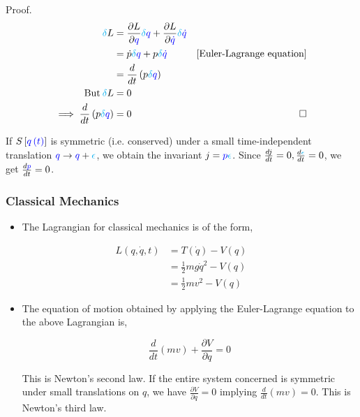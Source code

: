 \documentclass{beamer}
\begin{document}
\begin{frame}
\begin{block}{Proof.}
\begin{align*}
\textcolor{cyan}{\delta} L & = \frac{\partial L}{\partial \textcolor{blue}{q}} \textcolor{cyan}{\delta} \textcolor{blue}{q} + \frac{\partial L}{\partial \textcolor{blue}{\dot{q}}} \textcolor{cyan}{\delta} \textcolor{blue}{\dot{q}} \\
& = \dot{p} \textcolor{cyan}{\delta} \textcolor{blue}{q} + p \textcolor{cyan}{\delta} \textcolor{blue}{\dot{q}} & \left[ \text{Euler-Lagrange equation} \right] \\
& = \frac{d}{dt} \left( p \textcolor{cyan}{\delta} \textcolor{blue}{q} \right) \\
\text{But} \: \textcolor{cyan}{\delta} L & = 0 \\
\implies \frac{d}{dt} \left( p \textcolor{cyan}{\delta} \textcolor{blue}{q} \right) & = 0 & \square
\end{align*}
\end{block}

\begin{example}
If $S \left[ \textcolor{blue}{q \left( t \right)} \right]$ is symmetric (i.e. conserved) under a small time-independent translation $\textcolor{blue}{q} \to \textcolor{blue}{q} + \textcolor{cyan}{\epsilon}$, we obtain the invariant $j = \textcolor{blue}{p} \textcolor{cyan}{\epsilon}$. Since $\frac{dj}{dt} = 0, \frac{d \textcolor{cyan}{\epsilon}}{dt} = 0$, we get $\frac{d \textcolor{blue}{p}}{dt} = 0$.
\end{example}
\end{frame}

\begin{frame}
\frametitle{Classical Mechanics}

\begin{itemize}
\item The Lagrangian for classical mechanics is of the form,
\end{itemize}

\begin{align*}
L \left( q, \dot{q}, t \right) & = T \left( \dot{q} \right) - V \left( q \right) \\
& = \frac{1}{2} m \mathit{g} \dot{q}^2 - V \left( q \right) \\
& = \frac{1}{2} mv^2 - V \left( q \right)
\end{align*}

\begin{itemize}
\item The equation of motion obtained by applying the Euler-Lagrange equation to the above Lagrangian is,

$$\frac{d}{dt} \left( m v \right) + \frac{\partial V}{\partial q} = 0$$

This is Newton's second law. If the entire system concerned is symmetric under small translations on $q$, we have $\frac{\partial V}{\partial q} = 0$ implying $\frac{d}{dt} \left( m v \right) = 0$. This is Newton's third law.
\end{itemize}
\end{frame}
\end{document}
